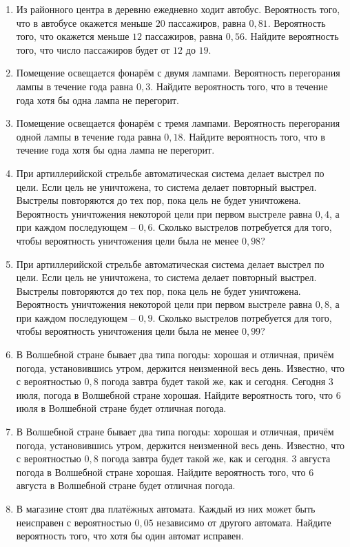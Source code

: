 \documentclass[12pt, a4paper]{article}
\begin{document}
\begin{enumerate}
		\item Из районного центра в деревню ежедневно ходит автобус. Вероятность того, что в автобусе окажется меньше \( 20 \) пассажиров, равна \( 0,81 \). Вероятность того, что окажется меньше \( 12 \) пассажиров, равна \( 0,56 \). Найдите вероятность того, что число пассажиров будет от \( 12 \) до \( 19 \).
		\item Помещение освещается фонарём с двумя лампами. Вероятность перегорания лампы в течение года равна \( 0,3 \). Найдите вероятность того, что в течение года хотя бы одна лампа не перегорит.
		\item Помещение освещается фонарём с тремя лампами. Вероятность перегорания одной лампы в течение года равна \( 0,18 \). Найдите вероятность того, что в течение года хотя бы одна лампа не перегорит.
		\item При артиллерийской стрельбе автоматическая система делает выстрел по цели. Если цель не уничтожена, то система делает повторный выстрел. Выстрелы повторяются до тех пор, пока цель не будет уничтожена. Вероятность уничтожения некоторой цели при первом выстреле равна \( 0,4 \), а при каждом последующем – \( 0,6 \). Сколько выстрелов потребуется для того, чтобы вероятность уничтожения цели была не менее \( 0,98 \)?
		\item При артиллерийской стрельбе автоматическая система делает выстрел по цели. Если цель не уничтожена, то система делает повторный выстрел. Выстрелы повторяются до тех пор, пока цель не будет уничтожена. Вероятность уничтожения некоторой цели при первом выстреле равна \( 0,8 \), а при каждом последующем – \( 0,9 \). Сколько выстрелов потребуется для того, чтобы вероятность уничтожения цели была не менее \( 0,99 \)?
		\item В Волшебной стране бывает два типа погоды: хорошая и отличная, причём погода, установившись утром, держится неизменной весь день. Известно, что с вероятностью \( 0,8  \) погода завтра будет такой же, как и сегодня. Сегодня \( 3 \) июля, погода в Волшебной стране хорошая. Найдите вероятность того, что 6 июля в Волшебной стране будет отличная погода.
		\item В Волшебной стране бывает два типа погоды: хорошая и отличная, причём погода, установившись утром, держится неизменной весь день. Известно, что с вероятностью \( 0,8 \) погода завтра будет такой же, как и сегодня. \( 3  \) августа погода в Волшебной стране хорошая. Найдите вероятность того, что 6 августа в Волшебной стране будет отличная погода.
		\item В магазине стоят два платёжных автомата. Каждый из них может быть неисправен с вероятностью \( 0,05 \) независимо от другого автомата. Найдите вероятность того, что хотя бы один автомат исправен.

\end{enumerate}
\end{document}
